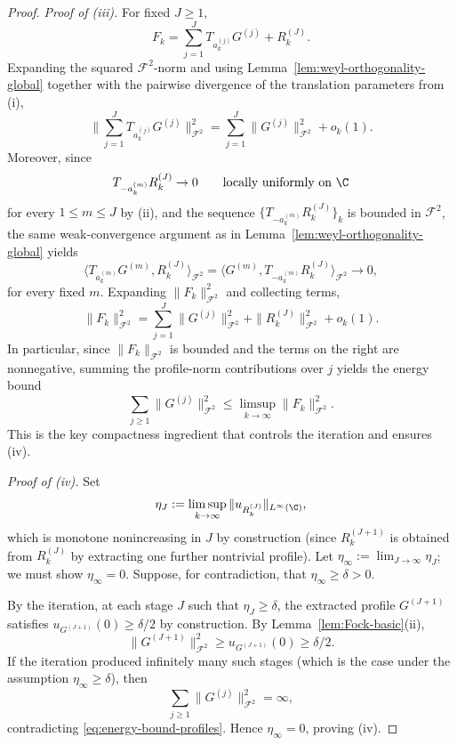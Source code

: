 \begin{proof}
\medskip
\noindent\emph{Proof of (iii).}
For fixed \(J\ge 1\),
\[
F_k=\sum_{j=1}^J T_{a_k^{(j)}}G^{(j)}+R_k^{(J)}.
\]
Expanding the squared \(\mathcal F^2\)-norm and using
Lemma~\ref{lem:weyl-orthogonality-global} together with the pairwise
divergence of the translation parameters from (i),
\[
\Big\|\sum_{j=1}^J T_{a_k^{(j)}}G^{(j)}\Big\|_{\mathcal F^2}^2
=
\sum_{j=1}^J \|G^{(j)}\|_{\mathcal F^2}^2+o_k(1).
\]
Moreover, since
\[
T_{-a_k^{(m)}}R_k^{(J)}\to 0
\qquad\text{locally uniformly on }\C
\]
for every \(1\le m\le J\) by (ii), and the sequence
\(\{T_{-a_k^{(m)}}R_k^{(J)}\}_k\) is bounded in \(\mathcal F^2\), the same
weak-convergence argument as in
Lemma~\ref{lem:weyl-orthogonality-global} yields
\[
\langle T_{a_k^{(m)}}G^{(m)},R_k^{(J)}\rangle_{\mathcal F^2}
=
\langle G^{(m)},T_{-a_k^{(m)}}R_k^{(J)}\rangle_{\mathcal F^2}\to 0,
\]
for every fixed \(m\). Expanding \(\|F_k\|_{\mathcal F^2}^2\) and collecting
terms,
\[
\|F_k\|_{\mathcal F^2}^2
=
\sum_{j=1}^J \|G^{(j)}\|_{\mathcal F^2}^2
+\|R_k^{(J)}\|_{\mathcal F^2}^2
+o_k(1).
\]
In particular, since \(\|F_k\|_{\mathcal F^2}\) is bounded and the terms on
the right are nonnegative, summing the profile-norm contributions over \(j\)
yields the energy bound
\begin{equation}\label{eq:energy-bound-profiles}
\sum_{j\ge 1}\|G^{(j)}\|_{\mathcal F^2}^2
\le \limsup_{k\to\infty}\|F_k\|_{\mathcal F^2}^2.
\end{equation}
This is the key compactness ingredient that controls the iteration and
ensures (iv).

\medskip
\noindent\emph{Proof of (iv).}
Set
\[
\eta_J:=\limsup_{k\to\infty}\|u_{R_k^{(J)}}\|_{L^\infty(\C)},
\]
which is monotone nonincreasing in \(J\) by construction (since
\(R_k^{(J+1)}\) is obtained from \(R_k^{(J)}\) by extracting one further
nontrivial profile). Let \(\eta_\infty:=\lim_{J\to\infty}\eta_J\); we must
show \(\eta_\infty=0\). Suppose, for contradiction, that
\(\eta_\infty\ge \delta>0\).

By the iteration, at each stage \(J\) such that \(\eta_J\ge \delta\), the
extracted profile \(G^{(J+1)}\) satisfies \(u_{G^{(J+1)}}(0)\ge \delta/2\) by
construction. By Lemma~\ref{lem:Fock-basic}(ii),
\[
\|G^{(J+1)}\|_{\mathcal F^2}^2 \ge u_{G^{(J+1)}}(0)\ge \delta/2.
\]
If the iteration produced infinitely many such stages (which is the case
under the assumption \(\eta_\infty\ge \delta\)), then
\[
\sum_{j\ge 1}\|G^{(j)}\|_{\mathcal F^2}^2=\infty,
\]
contradicting \eqref{eq:energy-bound-profiles}. Hence \(\eta_\infty=0\),
proving (iv).
\end{proof}

